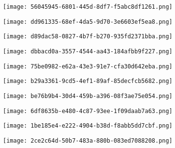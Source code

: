\documentclass[12pt]{article}
\begin{document}
\begin{labels}
    \centering
        \texttt{[image: 56045945-6801-445d-8df7-f5abc8df1261.png]}\\

    \centering
        \texttt{[image: dd961335-68ef-4da5-9d70-3e6603ef5ea8.png]}\\

    \centering
        \texttt{[image: d89dac58-0827-4b7f-b270-935fd2371bba.png]}\\

    \centering
        \texttt{[image: dbbacd0a-3557-4544-aa43-184afbb9f227.png]}\\

    \centering
        \texttt{[image: 75be0982-e62a-43e3-91e7-cfa30d642eba.png]}\\

    \centering
        \texttt{[image: b29a3361-9cd5-4ef1-89af-85decfcb5682.png]}\\

    \centering
        \texttt{[image: be76b9b4-30d4-459b-a396-08f3ae75e054.png]}\\

    \centering
        \texttt{[image: 6df8635b-e480-4c87-93ee-1f09daab7a63.png]}\\

    \centering
        \texttt{[image: 1be185e4-e222-4904-b38d-f8abb5dd7cbf.png]}\\

    \centering
        \texttt{[image: 2ce2c64d-50b7-483a-880b-083ed7088208.png]}\\

\end{labels}
\end{document}
